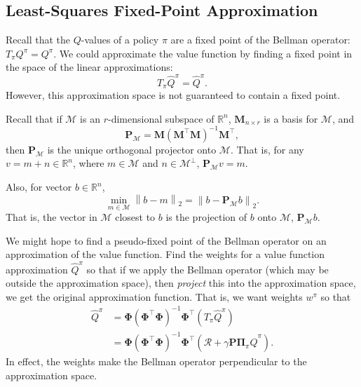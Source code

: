 \documentclass{article}
\newcommand{\R}{\mathbb{R}}
\newcommand{\norm}[1]{\left\|#1\right\|}
\begin{document}

\subsection*{Least-Squares Fixed-Point Approximation} %
\label{sub:least_squares_fixed_point_approximation}

Recall that the $Q$-values of a policy $\pi$ are a fixed point of the Bellman operator: $T_{\pi}Q^{\pi}=Q^{\pi}$.
We could approximate the value function by finding a fixed point in the space of the linear approximations:
\[
	T_{\pi}\hat{Q}^{\pi}= \hat{Q}^{\pi}.
\]
However, this approximation space is not guaranteed to contain a fixed point.

Recall that if $\mathcal{M}$ is an $r$-dimensional subspace of $\R^{n}$, $\mathbf{M}_{n\times r}$ is a basis for $\mathcal{M}$, and
\[
	\mathbf{P}_{\mathcal{M}}=\mathbf{M}(\mathbf{M}^{\intercal}\mathbf{M})^{-1}\mathbf{M}^{\intercal},
\]
then $\mathbf{P}_{\mathcal{M}}$ is the unique orthogonal projector onto $\mathcal{M}$. 
That is, for any $v=m+n\in \R^{n}$, where $m\in \mathcal{M}$ and $n\in \mathcal{M}^{\perp}$, $\mathbf{P}_{\mathcal{M}}v=m$.

Also, for vector $b\in \R^{n}$,
\[
	\min_{m\in \mathcal{M}}\norm{b-m}_{2}=\norm{b-\mathbf{P}_{\mathcal{M}}b}_{2}.
\]
That is, the vector in $\mathcal{M}$ closest to $b$ is the projection of $b$ onto $\mathcal{M}$, $\mathbf{P}_{\mathcal{M}}b$.

We might hope to find a pseudo-fixed point of the Bellman operator on an approximation of the value function.
Find the weights for a value function approximation $\hat{Q}^{\pi}$ so that if we apply the Bellman operator (which may be outside the approximation space), then \emph{project} this into the approximation space, we get the original approximation function.
That is, we want weights $w^{\pi}$ so that
\begin{align}\nonumber
	\hat{Q}^{\pi}&=\mathbf{\Phi}(\mathbf{\Phi}^\intercal\mathbf{\Phi})^{-1}\mathbf{\Phi}^\intercal(T_{\pi}\hat{Q}^{\pi})\\
	&= \mathbf{\Phi}(\mathbf{\Phi}^\intercal\mathbf{\Phi})^{-1}\mathbf{\Phi}^\intercal
		(\mathcal{R}+\gamma \mathbf{P}\mathbf{\Pi}_{\pi}\hat{Q}^{\pi}).\label{eq:fixedpoint}
\end{align} 
In effect, the weights make the Bellman operator perpendicular to the approximation space.
\end{document}
